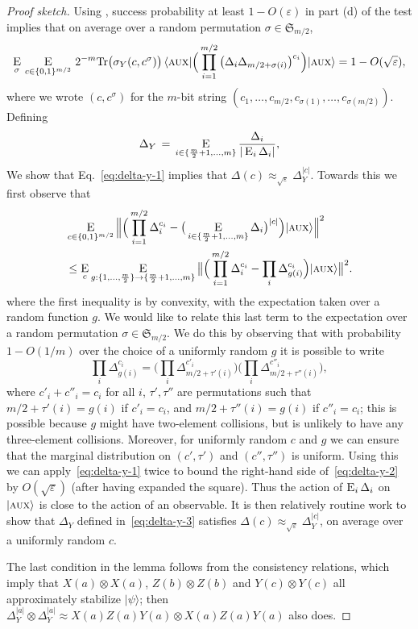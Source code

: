 \documentclass{toc}
\newcommand{\ket}[1]{|#1\rangle}
\newcommand{\bra}[1]{\langle#1|}
\newcommand{\Tr}{\mbox{\rm Tr}}
\newcommand{\Es}[1]{\ensuremath{\mathop{\textsc{E}}}_{#1}} %
\newcommand{\eps}{\varepsilon}
\newcommand{\aux}{\textsc {aux}}
\begin{document}
\begin{proof}[Proof sketch]
Using , %
success probability at least $1-O(\eps)$ in part (d) of the test implies that on average over a random permutation $\sigma \in \mathfrak{S}_{m/2}$, 
\begin{equation}\label{eq:delta-y-1}
 \Es{\sigma} \,\Es{c\in\{0,1\}^{m/2}}\,2^{-m}\Tr \big(\sigma_Y(c,c^\sigma)\big)\,\bra{\aux} \Big( \prod_{i=1}^{m/2}\big( \Delta_i \Delta_{m/2+ \sigma(i)} \big)^{c_i} \Big) \ket{\aux}  = 1- O(\sqrt{\eps}),
\end{equation}
where we wrote $(c,c^\sigma)$ for the $m$-bit string $(c_1,\ldots,c_{m/2},c_{\sigma(1)},\ldots,c_{\sigma(m/2)})$. Defining
 \begin{equation}\label{eq:delta-y-3}
\Delta_Y \,=\, \Es{i\in\{\frac{m}{2}+1,\ldots,m\}} \frac{\Delta_i}{|\Es{i} \Delta_i|},
\end{equation}
We show that Eq.~\eqref{eq:delta-y-1} implies that $\Delta(c) \approx_{\sqrt{\eps}} \Delta_Y^{|c|}$. Towards this we first observe that
\begin{align}
  &\Es{c\in\{0,1\}^{m/2}} \Big\| \Big(\prod_{i=1}^{m/2} \Delta_i^{c_i} -
  \big(\Es{i\in\{\frac{m}{2}+1,\ldots,m\}} \Delta_{i}\big)^{|c|}\Big) \ket{\aux}
  \Big\|^2\\&\leq 
\Es{c} \Es{g:\{1,\ldots,\frac{m}{2}\}\to\{\frac{m}{2}+1,\ldots,m\}} \big\|\Big(\prod_{i=1}^{m/2} \Delta_i^{c_i} - \prod_i \Delta_{g(i)}^{c_i}\Big) \ket{\aux} \big\|^2.\label{eq:delta-y-2}
\end{align}
where the first inequality is by convexity, with the expectation taken over a random function $g$. We would like to relate this last term to the expectation over a random permutation $\sigma\in\mathfrak{S}_{m/2}$. We do this by observing that with  probability $1-O(1/m)$ over the choice of a uniformly random $g$ it is possible to write
$$ \prod_i \Delta_{g(i)}^{c_i} = \Big(\prod_i \Delta_{m/2+\tau'(i)}^{c'_i}\Big)\Big(\prod_i \Delta_{m/2+\tau''(i)}^{c''_i}\Big),$$
where $c'_i+c''_i=c_i$ for all $i$, $\tau',\tau''$ are permutations such that $m/2+\tau'(i)=g(i)$ if $c'_i=c_i$, and $m/2+\tau''(i)=g(i)$ if $c''_i=c_i$; this is possible because $g$ might have two-element collisions, but is unlikely to have any three-element collisions. Moreover, for uniformly random $c$ and $g$ we can ensure that the marginal distribution on $(c',\tau')$ and $(c'',\tau'')$ is uniform.  Using this we can apply~\eqref{eq:delta-y-1} twice to bound the right-hand side of~\eqref{eq:delta-y-2} by $O(\sqrt{\eps})$ (after having expanded the square). Thus the action of $\Es{i}\Delta_i$ on $\ket{\aux}$ is close to the action of an observable. It is then relatively routine work to show that $\Delta_Y$ defined in~\eqref{eq:delta-y-3} satisfies $\Delta(c) \approx_{\sqrt{\eps}} \Delta_Y^{|c|}$, on average over a uniformly random $c$. 

The last condition in the lemma follows from the consistency relations, which imply that $X(a)\otimes X(a)$, $Z(b)\otimes Z(b)$ and $Y(c)\otimes Y(c)$ all approximately stabilize $\ket{\psi}$; then $\Delta_Y^{|a|} \otimes \Delta_Y^{|a|} \approx  X(a)Z(a)Y(a) \otimes X(a)Z(a)Y(a)$ also does. 
\end{proof}
\end{document}
